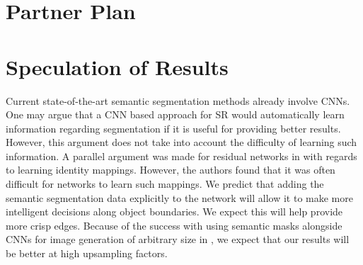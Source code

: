 \documentclass[10pt,twocolumn,letterpaper]{article}
\begin{document}

\section{Partner Plan}


\section{Speculation of Results}
Current state-of-the-art semantic segmentation methods already involve CNNs. One may argue that a CNN based approach for SR would automatically learn information regarding segmentation if it is useful for providing better results. However, this argument does not take into account the difficulty of learning such information. A parallel argument was made for residual networks in \cite{ResNet} with regards to learning identity mappings. However, the authors found that it was often difficult for networks to learn such mappings. We predict that adding the semantic segmentation data explicitly to the network will allow it to make more intelligent decisions along object boundaries. We expect this will help provide more crisp edges. Because of the success with using semantic masks alongside CNNs for image generation of arbitrary size in \cite{ImageSynthesis}, we expect that our results will be better at high upsampling factors.

{\small


}
\end{document}
